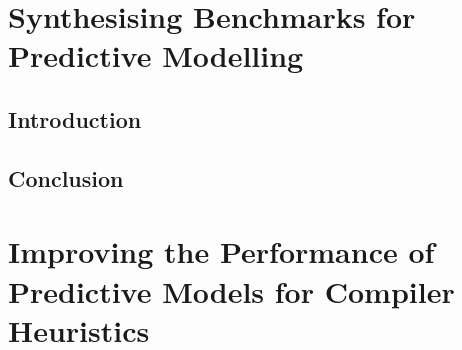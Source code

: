 \ifstapled
\chapter{Synthesising Benchmarks for Predictive Modelling}
\section{Introduction}
\lipsum[1-2]

\section{Conclusion}
\lipsum[1-2]
\else
\chapter{Improving the Performance of Predictive Models for Compiler Heuristics}
\label{chap:clgen}









\fi
